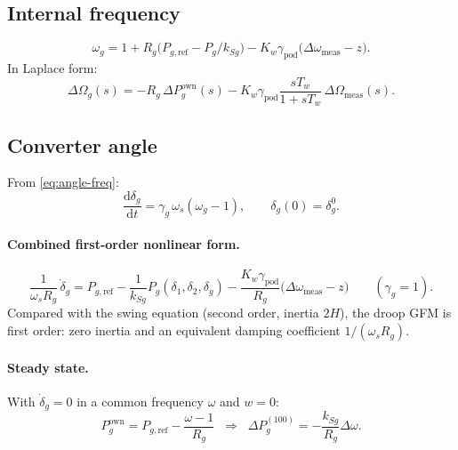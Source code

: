 \documentclass[11pt,a4paper]{article}
\numberwithin{equation}{section}
\newcommand{\dd}{\mathrm{d}}
\begin{document}
\subsection{Internal frequency}
\begin{equation}
\boxed{\omega_g = 1 + R_g\big(P_{g,\text{ref}} - P_g/k_{Sg}\big) - K_w\gamma_{\text{pod}}\big(\Delta\omega_{\text{meas}} - z\big).}
\end{equation}
In Laplace form:
\begin{equation}
\Delta\Omega_g(s) = -R_g\,\Delta P_g^{\text{own}}(s) - K_w\gamma_{\text{pod}}\frac{sT_w}{1+sT_w}\,\Delta\Omega_{\text{meas}}(s).
\end{equation}

\subsection{Converter angle}
From \eqref{eq:angle-freq}:
\begin{equation}
\boxed{\frac{\dd\delta_g}{\dd t} = \gamma_g\,\omega_s(\omega_g - 1),\qquad \delta_g(0) = \delta_g^0.}
\end{equation}
\paragraph{Combined first-order nonlinear form.}
\begin{equation}
\frac{1}{\omega_s R_g}\,\dot\delta_g
= P_{g,\text{ref}} - \frac{1}{k_{Sg}}P_g(\delta_1,\delta_2,\delta_g) - \frac{K_w\gamma_{\text{pod}}}{R_g}\big(\Delta\omega_{\text{meas}}-z\big)\qquad(\gamma_g=1).
\end{equation}
Compared with the swing equation (second order, inertia $2H$), the droop GFM is first order: zero inertia and an equivalent damping coefficient $1/(\omega_sR_g)$.

\paragraph{Steady state.} With $\dot\delta_g = 0$ in a common frequency $\omega$ and $w=0$:
\begin{equation}
P_g^{\text{own}} = P_{g,\text{ref}} - \frac{\omega - 1}{R_g}
\;\;\Longrightarrow\;\;
\Delta P_g^{(100)} = -\frac{k_{Sg}}{R_g}\Delta\omega .
\label{eq:gfm-ss}
\end{equation}

\end{document}
